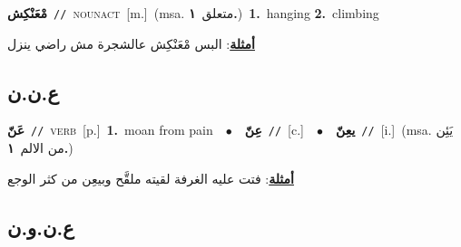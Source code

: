 \documentclass[10pt,a4paper,twoside]{article} %
\begin{document}
\begin{multicols}{2}
{\setlength\topsep{0pt}\textbf{\foreignlanguage{arabic}{مْعَنْكِش}}\ {\color{gray}\texttt{//}\color{black}}\ \textsc{noun\textunderscore act}\ [m.]\ \color{gray}(msa. \foreignlanguage{arabic}{متعلق}~\foreignlanguage{arabic}{\textbf{١.}})\color{black}\ \textbf{1.}~hanging  \textbf{2.}~climbing\  \begin{flushright}\color{gray}\foreignlanguage{arabic}{\textbf{\underline{\foreignlanguage{arabic}{أمثلة}}}: البس مْعَنْكِش عالشجرة مش راضي ينزل}\end{flushright}\color{black}} \vspace{2mm}

\vspace{-3mm}
\subsection*{\color{blue}\foreignlanguage{arabic}{ع.ن.ن}\color{blue}{}} 

{\setlength\topsep{0pt}\textbf{\foreignlanguage{arabic}{عَنّ}}\ {\color{gray}\texttt{//}\color{black}}\ \textsc{verb}\ [p.]\ \textbf{1.}~moan from pain\ \ $\bullet$\ \ \setlength\topsep{0pt}\textbf{\foreignlanguage{arabic}{عِنّ}}\ {\color{gray}\texttt{//}\color{black}}\ [c.]\ \ $\bullet$\ \ \setlength\topsep{0pt}\textbf{\foreignlanguage{arabic}{يعِنّ}}\ {\color{gray}\texttt{//}\color{black}}\ [i.]\ \color{gray}(msa. \foreignlanguage{arabic}{يَئِن من الالم}~\foreignlanguage{arabic}{\textbf{١.}})\color{black}\  \begin{flushright}\color{gray}\foreignlanguage{arabic}{\textbf{\underline{\foreignlanguage{arabic}{أمثلة}}}: فتت عليه الغرفة لقيته ملقَّح وبيعِن من كثر الوجع}\end{flushright}\color{black}} \vspace{2mm}

\vspace{-3mm}
\subsection*{\color{blue}\foreignlanguage{arabic}{ع.ن.و.ن}\color{blue}{}} 


\end{multicols}
\end{document}
